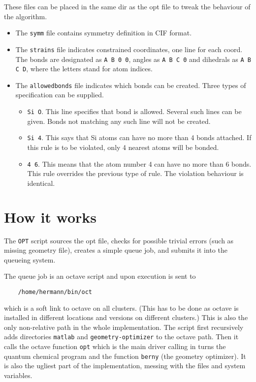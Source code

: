 \documentclass[12pt,a4]{article}
\begin{document}
These files can be placed in the same dir as the opt file to tweak the behaviour of the algorithm.
\begin{itemize}
\item The \texttt{symm} file contains symmetry definition in CIF format.
\item The \texttt{strains} file indicates constrained coordinates, one line for each coord. The bonds are designated as \texttt{A B 0 0}, angles as \texttt{A B C 0} and dihedrals as \texttt{A B C D}, where the letters stand for atom indices. 
\item The \texttt{allowedbonds} file indicates which bonds can be created. Three types of specification can be supplied.
\begin{itemize}
\item \texttt{Si O}. This line specifies that  bond is allowed. Several such lines can be given. Bonds not matching any such line will not be created.
\item \texttt{Si 4}. This says that Si atoms can have no more than 4 bonds attached. If this rule is to be violated, only 4 nearest atoms will be bonded.
\item \texttt{4 6}. This means that the atom number 4 can have no more than 6 bonds. This rule overrides the previous type of rule. The violation behaviour is identical.
\end{itemize}
\end{itemize}

\section{How it works}

The \texttt{OPT} script sources the opt file, checks for possible trivial errors (such as missing geometry file), creates a simple queue job, and submits it into the queueing system.

The queue job is an octave script and upon execution is sent to
\begin{verbatim}
	/home/hermann/bin/oct
\end{verbatim}
which is a soft link to octave on all clusters. (This has to be done as octave is installed in different locations and versions on different clusters.) This is also the only non-relative path in the whole implementation. The script first recursively adds directories \texttt{matlab} and \texttt{geometry-optimizer} to the octave path. Then it calls the octave function \texttt{opt} which is the main driver calling in turns the quantum chemical program and the function \texttt{berny} (the geometry optimizer). It is also the ugliest part of the implementation, messing with the files and system variables.
\end{document}
